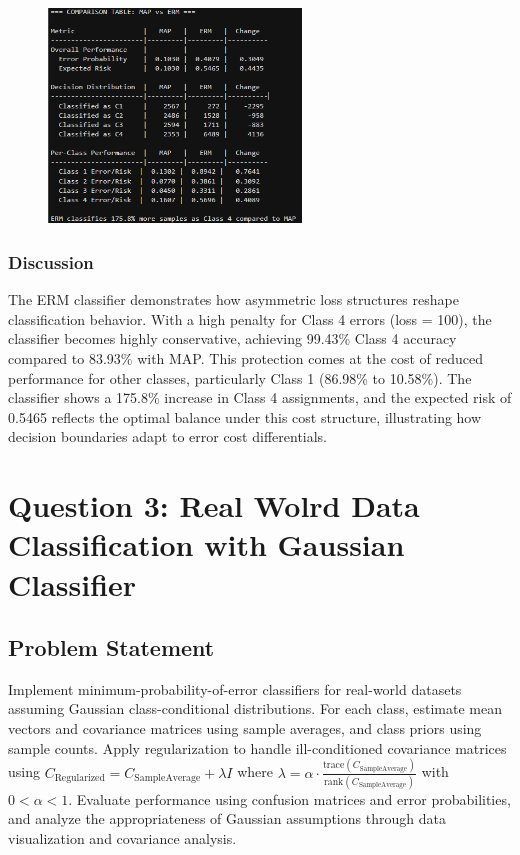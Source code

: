 \documentclass[12pt]{article}
\begin{document}
\begin{figure}[H]
    \centering
    \includegraphics[width=0.6\textwidth]{q2_comparison_output.png}
\end{figure}

\subsubsection{Discussion}
The ERM classifier demonstrates how asymmetric loss structures reshape classification behavior. With a high penalty for Class 4 errors (loss = 100), the classifier becomes highly conservative, achieving 99.43\% Class 4 accuracy compared to 83.93\% with MAP. This protection comes at the cost of reduced performance for other classes, particularly Class 1 (86.98\% to 10.58\%). The classifier shows a 175.8\% increase in Class 4 assignments, and the expected risk of 0.5465 reflects the optimal balance under this cost structure, illustrating how decision boundaries adapt to error cost differentials.


\newpage
\section{Question 3: Real Wolrd Data Classification with Gaussian Classifier}

\subsection{Problem Statement}
Implement minimum-probability-of-error classifiers for real-world datasets assuming Gaussian class-conditional distributions. For each class, estimate mean vectors and covariance matrices using sample averages, and class priors using sample counts. Apply regularization to handle ill-conditioned covariance matrices using $C_{\text{Regularized}} = C_{\text{SampleAverage}} + \lambda I$ where $\lambda = \alpha \cdot \frac{\text{trace}(C_{\text{SampleAverage}})}{\text{rank}(C_{\text{SampleAverage}})}$ with $0 < \alpha < 1$. Evaluate performance using confusion matrices and error probabilities, and analyze the appropriateness of Gaussian assumptions through data visualization and covariance analysis.
\end{document}
